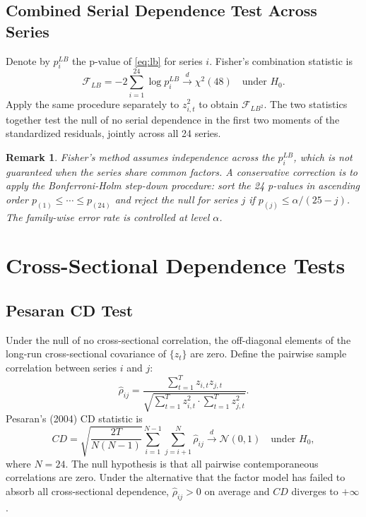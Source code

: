 \documentclass[12pt]{article}
\newtheorem{remark}{Remark}
\begin{document}
\subsection{Combined Serial Dependence Test Across Series}

Denote by $p_i^{LB}$ the p-value of \eqref{eq:lb} for series $i$. Fisher's combination
statistic is
\begin{equation}
    \mathcal{F}_{LB} = -2 \sum_{i=1}^{24} \log p_i^{LB}
    \overset{d}{\to} \chi^2(48) \quad \text{under } H_0.
    \label{eq:fisher_lb}
\end{equation}
Apply the same procedure separately to $z_{i,t}^2$ to obtain $\mathcal{F}_{LB^2}$. The
two statistics together test the null of no serial dependence in the first two moments of the
standardized residuals, jointly across all 24 series.

\begin{remark}
    Fisher's method assumes independence across the $p_i^{LB}$, which is not guaranteed
    when the series share common factors. A conservative correction is to apply the
    Bonferroni-Holm step-down procedure: sort the 24 p-values in ascending order
    $p_{(1)} \leq \cdots \leq p_{(24)}$ and reject the null for series $j$ if
    $p_{(j)} \leq \alpha / (25 - j)$. The family-wise error rate is controlled at level
    $\alpha$.
\end{remark}

\section{Cross-Sectional Dependence Tests}

\subsection{Pesaran CD Test}

Under the null of no cross-sectional correlation, the off-diagonal elements of the
long-run cross-sectional covariance of $\{z_t\}$ are zero. Define the pairwise sample
correlation between series $i$ and $j$:
\begin{equation}
    \hat{\rho}_{ij} = \frac{\sum_{t=1}^T z_{i,t} z_{j,t}}
    {\sqrt{\sum_{t=1}^T z_{i,t}^2 \cdot \sum_{t=1}^T z_{j,t}^2}}.
\end{equation}
Pesaran's (2004) CD statistic is
\begin{equation}
    CD = \sqrt{\frac{2T}{N(N-1)}} \sum_{i=1}^{N-1} \sum_{j=i+1}^{N} \hat{\rho}_{ij}
    \overset{d}{\to} \mathcal{N}(0,1) \quad \text{under } H_0,
    \label{eq:cd}
\end{equation}
where $N = 24$. The null hypothesis is that all pairwise contemporaneous correlations
are zero. Under the alternative that the factor model has failed to absorb all
cross-sectional dependence, $\hat{\rho}_{ij} > 0$ on average and $CD$ diverges to
$+\infty$.
\end{document}
